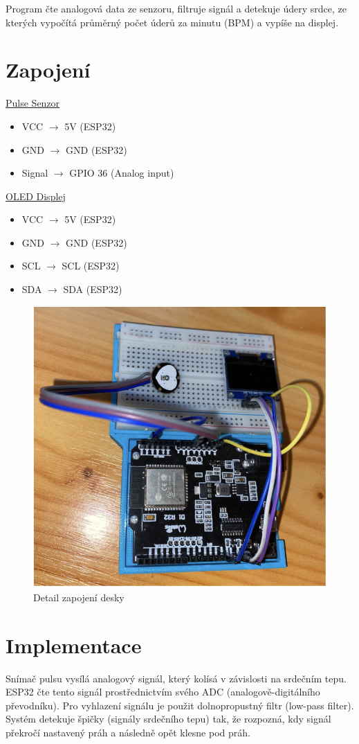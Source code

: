 \documentclass[11pt,a4paper]{article}
\begin{document}
Program čte analogová data ze senzoru, filtruje signál a detekuje údery srdce, ze kterých vypočítá průměrný počet úderů za minutu (BPM) a vypíše na displej.

\section{Zapojení}

\underline{Pulse Senzor}
\begin{itemize}
    \item VCC $\rightarrow$ 5V (ESP32)
    \item GND $\rightarrow$ GND (ESP32)
    \item Signal $\rightarrow$ GPIO 36 (Analog input)
\end{itemize}

\underline{OLED Displej}
\begin{itemize}
    \item VCC $\rightarrow$ 5V (ESP32)
    \item GND $\rightarrow$ GND (ESP32)
    \item SCL $\rightarrow$ SCL (ESP32)
    \item SDA $\rightarrow$ SDA (ESP32)
\end{itemize}

 \begin{figure}[ht]
    \centering
    \includegraphics[width=0.6\linewidth]{zapojeni.png}
    \caption{Detail zapojení desky}
\end{figure}

\section{Implementace}

Snímač pulsu vysílá analogový signál, který kolísá v závislosti na srdečním tepu. ESP32 čte tento signál prostřednictvím svého ADC (analogově-digitálního převodníku). Pro vyhlazení signálu je použit dolnopropustný filtr (low-pass filter). Systém detekuje špičky (signály srdečního tepu) tak, že rozpozná, kdy signál překročí nastavený práh a následně opět klesne pod práh.
\end{document}
